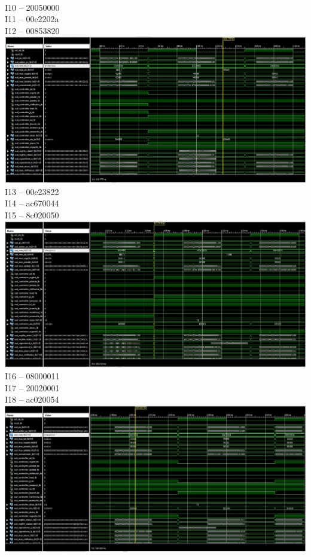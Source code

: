 \documentclass{article}
\begin{document}
	\\
	I10 -- 20050000 \\
	I11 -- 00e2202a \\
	I12 -- 00853820 \\
  \includegraphics[width=1\columnwidth]{i04.JPG}
	\\
	I13 -- 00e23822 \\
	I14 -- ac670044 \\
	I15 -- 8c020050 \\
  \includegraphics[width=1\columnwidth]{i05.JPG}
	\\
	I16 -- 08000011 \\
	I17 -- 20020001 \\
	I18 -- ac020054 \\
  \includegraphics[width=1\columnwidth]{i06.JPG}
	
\end{document}
